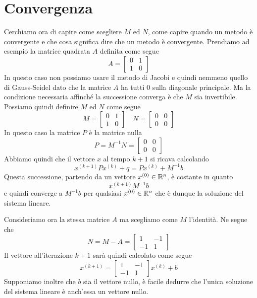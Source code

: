 \section{Convergenza}
Cerchiamo ora di capire come scegliere $M$ ed $N$, come capire quando un metodo è convergente e che cosa
significa dire che un metodo è convergente. Prendiamo ad esempio la matrice quadrata $A$ definita come segue
\[
	A = \begin{bmatrix}
		0 & 1 \\
		1 & 0
	\end{bmatrix}
\]
In questo caso non possiamo usare il metodo di Jacobi e quindi nemmeno quello di Gauss-Seidel dato che la
matrice $A$ ha tutti 0 sulla diagonale principale. Ma la condizione necessaria affinché la successione
converga è che $M$ sia invertibile. Possiamo quindi definire $M$ ed $N$ come segue
\[
	M = \begin{bmatrix}
		0 & 1 \\
		1 & 0
	\end{bmatrix} \quad
	N = \begin{bmatrix}
		0 & 0 \\
		0 & 0
	\end{bmatrix}
\]
In questo caso la matrice $P$ è la matrice nulla
\[
	P = M^{-1} N = \begin{bmatrix}
		0 & 0 \\
		0 & 0
	\end{bmatrix}
\]
Abbiamo quindi che il vettore $x$ al tempo $k+1$ si ricava calcolando
\[ x^{(k+1)} P x^{(k)} + q = P x^{(k)} + M^{-1} b \]
Questa successione, partendo da un vettore $x^{(0)} \in \mathbb{R}^n$, è costante in quanto
\[ x^{(k+1)} M^{-1} b \]
e quindi converge a $M^{-1} b$ per qualsiasi $x^{(0)} \in \mathbb{R}^n$ che è dunque la soluzione del sistema lineare.

Consideriamo ora la stessa matrice $A$ ma scegliamo come $M$ l'identità. Ne segue che
\[
	N = M - A = \begin{bmatrix}
		1  & -1 \\
		-1 & 1
	\end{bmatrix}
\]
Il vettore all'iterazione $k+1$ sarà quindi calcolato come segue
\[
	x^{(k+1)} = \begin{bmatrix}
		1  & -1 \\
		-1 & 1
	\end{bmatrix} x^{(k)} + b
\]
Supponiamo inoltre che $b$ sia il vettore nullo, è facile dedurre che l'unica soluzione del sistema lineare è
anch'essa un vettore nullo.


